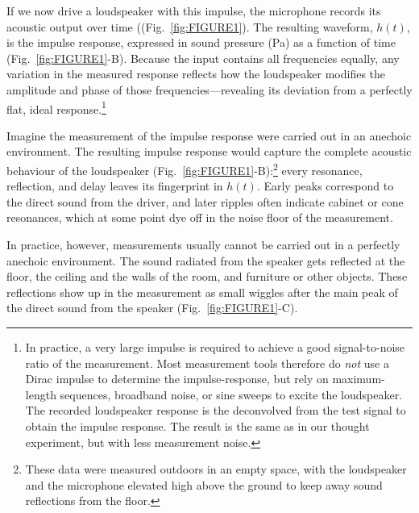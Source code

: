 \documentclass[12pt,a4paper]{article}
\providecommand{\figr}[1]{Fig.~\ref{fig:#1}}
\begin{document}
If we now drive a loudspeaker with this impulse, the microphone records its acoustic output over time ((\figr{FIGURE1}).  
The resulting waveform, $h(t)$, is the impulse response, expressed in sound pressure (Pa) as a function of time (\figr{FIGURE1}-B). Because the input contains all frequencies equally, any variation in the measured response reflects how the loudspeaker modifies the amplitude and phase of those frequencies—revealing its deviation from a perfectly flat, ideal response.\footnote{In practice, a very large impulse is required to achieve a good signal-to-noise ratio of the measurement. Most measurement tools therefore do \emph{not} use a Dirac impulse to determine the impulse-response, but rely on maximum-length sequences, broadband noise, or sine sweeps to excite the loudspeaker. The recorded loudspeaker response is the deconvolved from the test signal to obtain the impulse response. The result is the same as in our thought experiment, but with less measurement noise.}

Imagine the measurement of the impulse response were carried out in an anechoic environment. The resulting impulse response would capture the complete acoustic behaviour of the loudspeaker (\figr{FIGURE1}-B):\footnote{These data were measured outdoors in an empty space, with the loudspeaker and the microphone elevated high above the ground to keep away sound reflections from the floor.} every resonance, reflection, and delay leaves its fingerprint in $h(t)$. Early peaks correspond to the direct sound from the driver, and later ripples often indicate cabinet or cone resonances, which at some point dye off in the noise floor of the measurement.

In practice, however, measurements usually cannot be carried out in a perfectly anechoic environment. The sound radiated from the speaker gets reflected at the floor, the ceiling and the walls of the room, and furniture or other objects. These reflections show up in the measurement as small wiggles after the main peak of the direct sound from the speaker (\figr{FIGURE1}-C).
\end{document}
